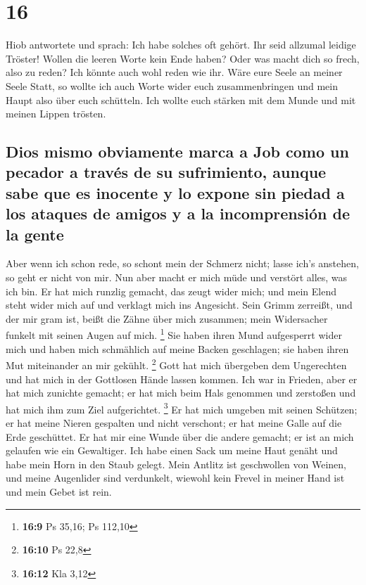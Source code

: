 \hypertarget{section-15}{%
\section{16}\label{section-15}}

 Hiob antwortete und sprach:  Ich habe
solches oft gehört. Ihr seid allzumal leidige Tröster! 
Wollen die leeren Worte kein Ende haben? Oder was macht dich so frech,
also zu reden?  Ich könnte auch wohl reden wie ihr. Wäre
eure Seele an meiner Seele Statt, so wollte ich auch Worte wider euch
zusammenbringen und mein Haupt also über euch schütteln. 
Ich wollte euch stärken mit dem Munde und mit meinen Lippen trösten.

\hypertarget{dios-mismo-obviamente-marca-a-job-como-un-pecador-a-travuxe9s-de-su-sufrimiento-aunque-sabe-que-es-inocente-y-lo-expone-sin-piedad-a-los-ataques-de-amigos-y-a-la-incomprensiuxf3n-de-la-gente}{%
\subsection{Dios mismo obviamente marca a Job como un pecador a través
de su sufrimiento, aunque sabe que es inocente y lo expone sin piedad a
los ataques de amigos y a la incomprensión de la
gente}\label{dios-mismo-obviamente-marca-a-job-como-un-pecador-a-travuxe9s-de-su-sufrimiento-aunque-sabe-que-es-inocente-y-lo-expone-sin-piedad-a-los-ataques-de-amigos-y-a-la-incomprensiuxf3n-de-la-gente}}

 Aber wenn ich schon rede, so schont mein der Schmerz
nicht; lasse ich's anstehen, so geht er nicht von mir. 
Nun aber macht er mich müde und verstört alles, was ich bin.
 Er hat mich runzlig gemacht, das zeugt wider mich; und
mein Elend steht wider mich auf und verklagt mich ins Angesicht.
 Sein Grimm zerreißt, und der mir gram ist, beißt die
Zähne über mich zusammen; mein Widersacher funkelt mit seinen Augen auf
mich. \footnote{\textbf{16:9} Ps 35,16; Ps 112,10}  Sie
haben ihren Mund aufgesperrt wider mich und haben mich schmählich auf
meine Backen geschlagen; sie haben ihren Mut miteinander an mir gekühlt.
\footnote{\textbf{16:10} Ps 22,8}  Gott hat mich
übergeben dem Ungerechten und hat mich in der Gottlosen Hände lassen
kommen.  Ich war in Frieden, aber er hat mich zunichte
gemacht; er hat mich beim Hals genommen und zerstoßen und hat mich ihm
zum Ziel aufgerichtet. \footnote{\textbf{16:12} Kla 3,12}
 Er hat mich umgeben mit seinen Schützen; er hat meine
Nieren gespalten und nicht verschont; er hat meine Galle auf die Erde
geschüttet.  Er hat mir eine Wunde über die andere
gemacht; er ist an mich gelaufen wie ein Gewaltiger.  Ich
habe einen Sack um meine Haut genäht und habe mein Horn in den Staub
gelegt.  Mein Antlitz ist geschwollen von Weinen, und
meine Augenlider sind verdunkelt,  wiewohl kein Frevel in
meiner Hand ist und mein Gebet ist rein.

